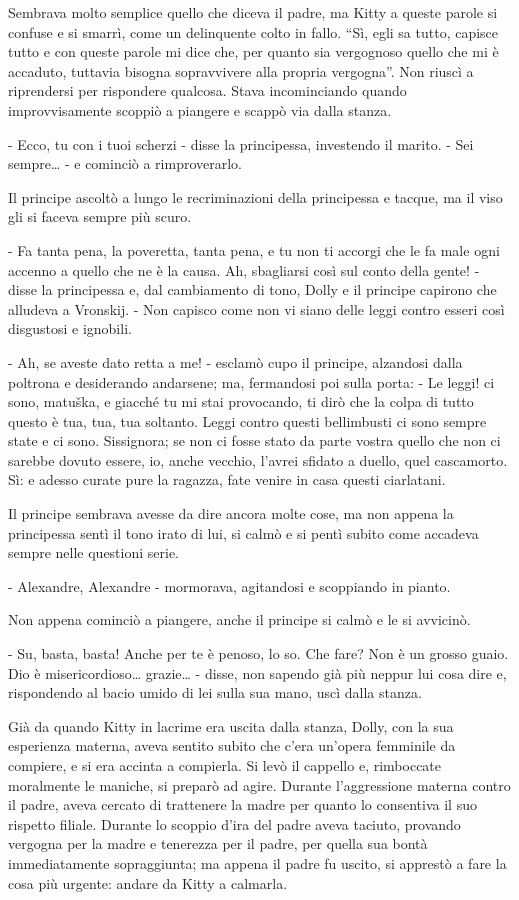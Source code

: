 Sembrava molto semplice quello che diceva il padre, ma Kitty a queste parole si confuse e si smarrì, come un delinquente colto in fallo. ``Sì, egli sa tutto, capisce tutto e con queste parole mi dice che, per quanto sia vergognoso quello che mi è accaduto, tuttavia bisogna sopravvivere alla propria vergogna''. Non riuscì a riprendersi per rispondere qualcosa. Stava incominciando quando improvvisamente scoppiò a piangere e scappò via dalla stanza. 

- Ecco, tu con i tuoi scherzi - disse la principessa, investendo il marito. - Sei sempre\ldots{} - e cominciò a rimproverarlo. 

Il principe ascoltò a lungo le recriminazioni della principessa e tacque, ma il viso gli si faceva sempre più scuro. 

- Fa tanta pena, la poveretta, tanta pena, e tu non ti accorgi che le fa male ogni accenno a quello che ne è la causa. Ah, sbagliarsi così sul conto della gente! - disse la principessa e, dal cambiamento di tono, Dolly e il principe capirono che alludeva a Vronskij. - Non capisco come non vi siano delle leggi contro esseri così disgustosi e ignobili. 

- Ah, se aveste dato retta a me! - esclamò cupo il principe, alzandosi dalla poltrona e desiderando andarsene; ma, fermandosi poi sulla porta: - Le leggi! ci sono, matuška, e giacché tu mi stai provocando, ti dirò che la colpa di tutto questo è tua, tua, tua soltanto. Leggi contro questi bellimbusti ci sono sempre state e ci sono. Sissignora; se non ci fosse stato da parte vostra quello che non ci sarebbe dovuto essere, io, anche vecchio, l'avrei sfidato a duello, quel cascamorto. Sì: e adesso curate pure la ragazza, fate venire in casa questi ciarlatani. 

Il principe sembrava avesse da dire ancora molte cose, ma non appena la principessa sentì il tono irato di lui, si calmò e si pentì subito come accadeva sempre nelle questioni serie. 

- Alexandre, Alexandre - mormorava, agitandosi e scoppiando in pianto. 

Non appena cominciò a piangere, anche il principe si calmò e le si avvicinò. 

- Su, basta, basta! Anche per te è penoso, lo so. Che fare? Non è un grosso guaio. Dio è misericordioso\ldots{} grazie\ldots{} - disse, non sapendo già più neppur lui cosa dire e, rispondendo al bacio umido di lei sulla sua mano, uscì dalla stanza. 

Già da quando Kitty in lacrime era uscita dalla stanza, Dolly, con la sua esperienza materna, aveva sentito subito che c'era un'opera femminile da compiere, e si era accinta a compierla. Si levò il cappello e, rimboccate moralmente le maniche, si preparò ad agire. Durante l'aggressione materna contro il padre, aveva cercato di trattenere la madre per quanto lo consentiva il suo rispetto filiale. Durante lo scoppio d'ira del padre aveva taciuto, provando vergogna per la madre e tenerezza per il padre, per quella sua bontà immediatamente sopraggiunta; ma appena il padre fu uscito, si apprestò a fare la cosa più urgente: andare da Kitty a calmarla. 

